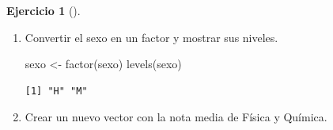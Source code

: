 \documentclass[
  spanish,
  a4paper,
]{scrreport}
\newenvironment{Shaded}{\begin{snugshade}}{\end{snugshade}}
\newcommand{\ConstantTok}[1]{\textcolor[rgb]{0.56,0.35,0.01}{#1}}
\newcommand{\DecValTok}[1]{\textcolor[rgb]{0.68,0.00,0.00}{#1}}
\newcommand{\FloatTok}[1]{\textcolor[rgb]{0.68,0.00,0.00}{#1}}
\newcommand{\FunctionTok}[1]{\textcolor[rgb]{0.28,0.35,0.67}{#1}}
\newcommand{\NormalTok}[1]{\textcolor[rgb]{0.00,0.23,0.31}{#1}}
\newcommand{\OtherTok}[1]{\textcolor[rgb]{0.00,0.23,0.31}{#1}}
\newcommand{\StringTok}[1]{\textcolor[rgb]{0.13,0.47,0.30}{#1}}
\theoremstyle{definition}
\newtheorem{exercise}{Ejercicio}[chapter]
\theoremstyle{definition}
\theoremstyle{remark}
\begin{document}
\begin{exercise}[]
\begin{enumerate}
\begin{tcolorbox}
\begin{Shaded}
\begin{Highlighting}[]
\NormalTok{nombre }\OtherTok{\textless{}{-}} \FunctionTok{c}\NormalTok{(}\StringTok{"Carlos"}\NormalTok{, }\StringTok{"María"}\NormalTok{, }\StringTok{"Carmen"}\NormalTok{, }\StringTok{"Pedro"}\NormalTok{, }\StringTok{"Luis"}\NormalTok{, }\StringTok{"Sara"}\NormalTok{)}
\NormalTok{sexo }\OtherTok{\textless{}{-}} \FunctionTok{c}\NormalTok{(}\StringTok{"H"}\NormalTok{, }\StringTok{"M"}\NormalTok{, }\StringTok{"M"}\NormalTok{, }\StringTok{"H"}\NormalTok{, }\StringTok{"H"}\NormalTok{, }\StringTok{"M"}\NormalTok{)}
\NormalTok{fisica }\OtherTok{\textless{}{-}} \FunctionTok{c}\NormalTok{(}\FloatTok{6.7}\NormalTok{, }\FloatTok{7.2}\NormalTok{, }\FloatTok{5.5}\NormalTok{, }\ConstantTok{NA}\NormalTok{, }\FloatTok{3.5}\NormalTok{, }\FloatTok{6.2}\NormalTok{)}
\NormalTok{quimica }\OtherTok{\textless{}{-}} \FunctionTok{c}\NormalTok{(}\FloatTok{8.1}\NormalTok{, }\FloatTok{9.5}\NormalTok{, }\DecValTok{5}\NormalTok{, }\FloatTok{4.5}\NormalTok{, }\DecValTok{5}\NormalTok{, }\DecValTok{4}\NormalTok{)}
\end{Highlighting}
\end{Shaded}

  \end{tcolorbox}
\item
  Convertir el sexo en un factor y mostrar sus niveles.

  \begin{tcolorbox}[enhanced jigsaw, arc=.35mm, bottomrule=.15mm, bottomtitle=1mm, breakable, colback=white, colbacktitle=quarto-callout-note-color!10!white, colframe=quarto-callout-note-color-frame, coltitle=black, left=2mm, leftrule=.75mm, opacityback=0, opacitybacktitle=0.6, rightrule=.15mm, title=\textcolor{quarto-callout-note-color}{\faInfo}\hspace{0.5em}{Solución}, titlerule=0mm, toprule=.15mm, toptitle=1mm]

\begin{Shaded}
\begin{Highlighting}[]
\NormalTok{sexo }\OtherTok{\textless{}{-}} \FunctionTok{factor}\NormalTok{(sexo)}
\FunctionTok{levels}\NormalTok{(sexo)}
\end{Highlighting}
\end{Shaded}

\begin{verbatim}
[1] "H" "M"
\end{verbatim}

  \end{tcolorbox}
\item
  Crear un nuevo vector con la nota media de Física y Química.


\end{enumerate}
\end{exercise}
\end{document}
